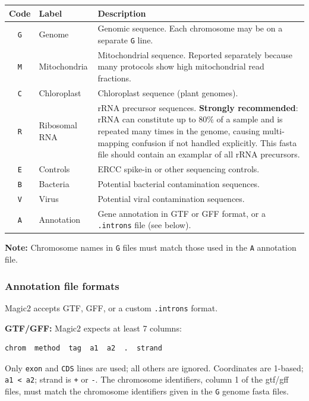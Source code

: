 \documentclass[11pt]{article}
\newcommand{\code}[1]{\texttt{#1}}
\begin{document}
\begin{center}
\begin{tabular}{clp{8.5cm}}
\toprule
\textbf{Code} & \textbf{Label} & \textbf{Description} \\
\midrule
\code{G} & Genome
  & Genomic sequence.  Each chromosome may be on a separate \code{G} line. \\
\code{M} & Mitochondria
  & Mitochondrial sequence.  Reported separately because many protocols
    show high mitochondrial read fractions. \\
\code{C} & Chloroplast
  & Chloroplast sequence (plant genomes). \\
\code{R} & Ribosomal RNA
  & rRNA precursor sequences.  \textbf{Strongly recommended}: rRNA can
    constitute up to 80\% of a sample and is repeated many times in the
    genome, causing multi-mapping confusion if not handled explicitly.
    This fasta file should contain an examplar of all rRNA precursors.\\
\code{E} & Controls
  & ERCC spike-in or other sequencing controls. \\
\code{B} & Bacteria
  & Potential bacterial contamination sequences. \\
\code{V} & Virus
  & Potential viral contamination sequences. \\
\code{A} & Annotation
  & Gene annotation in GTF or GFF format, or a \code{.introns} file
    (see below). \\
\bottomrule
\end{tabular}
\end{center}

\begin{notebox}
\textbf{Note:} Chromosome names in \code{G} files must match those
used in the \code{A} annotation file.
\end{notebox}

\subsubsection{Annotation file formats}

Magic2 accepts GTF, GFF, or a custom \code{.introns} format.

\textbf{GTF/GFF:} Magic2 expects at least 7 columns:
\begin{lstlisting}
chrom  method  tag  a1  a2  .  strand
\end{lstlisting}
Only \code{exon} and \code{CDS} lines are used; all others are ignored.
Coordinates are 1-based; \code{a1 < a2}; strand is \code{+} or \code{-}.
The chromosome identifiers, column 1 of the gtf/gff files, must match the
chromosome identifiers given in the \code{G} genome fasta files.
\end{document}
